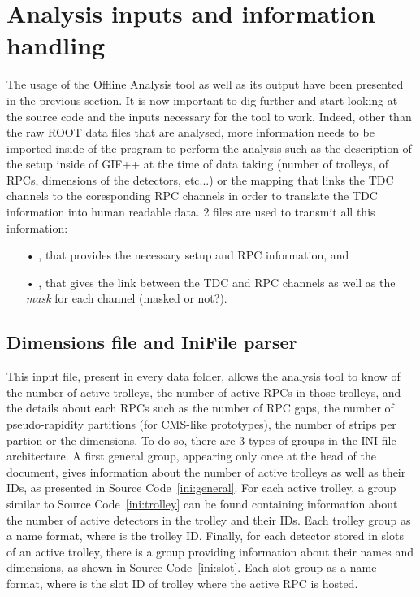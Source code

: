 \section{Analysis inputs and information handling}
\label{app2:sec:inputs}
	
	The usage of the Offline Analysis tool as well as its output have been presented in the previous section. It is now important to dig further and start looking at the source code and the inputs necessary for the tool to work. Indeed, other than the raw ROOT data files that are analysed, more information needs to be imported inside of the program to perform the analysis such as the description of the setup inside of GIF++ at the time of data taking (number of trolleys, of RPCs, dimensions of the detectors, etc...) or the mapping that links the TDC channels to the coresponding RPC channels in order to translate the TDC information into human readable data. 2 files are used to transmit all this information:\\
	
	\begin{itemize}
		\item[•] , that provides the necessary setup and RPC information, and
		\item[•] , that gives the link between the TDC and RPC channels as well as the \textit{mask} for each channel (masked or not?).
	\end{itemize}
	
	\subsection{Dimensions file and IniFile parser}
	\label{app2:ssec:dimensions}
	
	This input file, present in every data folder, allows the analysis tool to know of the number of active trolleys, the number of active RPCs in those trolleys, and the details about each RPCs such as the number of RPC gaps, the number of pseudo-rapidity partitions (for CMS-like prototypes), the number of strips per partion or the dimensions. To do so, there are 3 types of groups in the INI file architecture. A first general group, appearing only once at the head of the document, gives information about the number of active trolleys as well as their IDs, as presented in Source Code~\ref{ini:general}. For each active trolley, a group similar to Source Code~\ref{ini:trolley} can be found containing information about the number of active detectors in the trolley and their IDs. Each trolley group as a  name format, where  is the trolley ID. Finally, for each detector stored in slots of an active trolley, there is a group providing information about their names and dimensions, as shown in Source Code~\ref{ini:slot}. Each slot group as a  name format, where  is the slot ID of trolley  where the active RPC is hosted.\\
	
